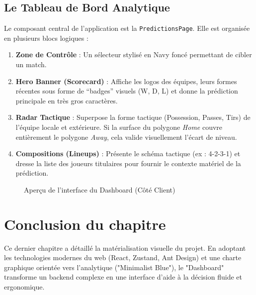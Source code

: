 \documentclass[12pt,a4paper,oneside]{book}
\begin{document}
\subsection{Le Tableau de Bord Analytique}
Le composant central de l'application est la \texttt{PredictionsPage}. Elle est organisée en plusieurs blocs logiques :
\begin{enumerate}
    \item \textbf{Zone de Contrôle} : Un sélecteur stylisé en Navy foncé permettant de cibler un match.
    \item \textbf{Hero Banner (Scorecard)} : Affiche les logos des équipes, leurs formes récentes sous forme de ``badges'' visuels (W, D, L) et donne la prédiction principale en très gros caractères.
    \item \textbf{Radar Tactique} : Superpose la forme tactique (Possession, Passes, Tirs) de l'équipe locale et extérieure. Si la surface du polygone \textit{Home} couvre entièrement le polygone \textit{Away}, cela valide visuellement l'écart de niveau.
    \item \textbf{Compositions (Lineups)} : Présente le schéma tactique (ex : 4-2-3-1) et dresse la liste des joueurs titulaires pour fournir le contexte matériel de la prédiction.
\end{enumerate}

\begin{figure}[H]
    \centering
    \caption{Aperçu de l'interface du Dashboard (Côté Client)}
\end{figure}

\section*{Conclusion du chapitre}
Ce dernier chapitre a détaillé la matérialisation visuelle du projet. En adoptant les technologies modernes du web (React, Zustand, Ant Design) et une charte graphique orientée vers l'analytique ("Minimalist Blue"), le "Dashboard" transforme un backend complexe en une interface d'aide à la décision fluide et ergonomique.

\end{document}
